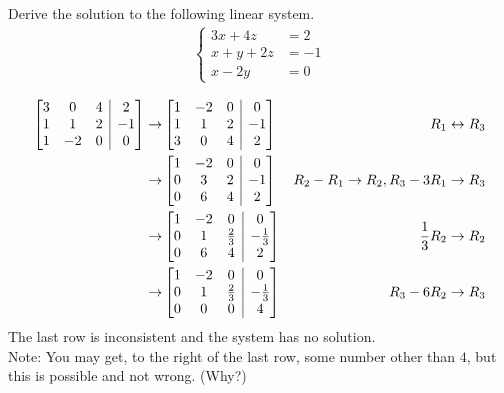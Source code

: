 \begin{Exercise}
Derive the solution to the following linear system.
\begin{align*}
\begin{cases}
3x + 4z &= 2\\
x + y + 2z &= -1\\
x - 2y &= 0
\end{cases}
\end{align*}
\end{Exercise}
\begin{Answer}
\begin{align*}
\left[
\begin{array}{@{}ccc|c@{}}
3 & 0 & 4 & 2\\
1 & 1 & 2 & -1\\
1 & -2 & 0 & 0
\end{array}
\right]
\to &
\left[
\begin{array}{@{}ccc|c@{}}
1 & -2 & 0 & 0\\
1 & 1 & 2 & -1\\
3 & 0 & 4 & 2\\
\end{array}
\right]
& R_1 \leftrightarrow R_3\\
\to &
\left[
\begin{array}{@{}ccc|c@{}}
1 & -2 & 0 & 0\\
0 & 3 & 2 & -1\\
0 & 6 & 4 & 2
\end{array}
\right]
& R_2 - R_1 \to R_2, R_3 - 3R_1 \to R_3 \\
\to &
\left[
\begin{array}{@{}ccc|c@{}}
1 & -2 & 0 & 0\\
0 & 1 & \frac{2}{3} & -\frac{1}{3}\\
0 & 6 & 4 & 2
\end{array}
\right] & \frac{1}{3}R_2 \to R_2 \\
\to &
\left[
\begin{array}{@{}ccc|c@{}}
1 & -2 & 0 & 0\\
0 & 1 & \frac{2}{3} & -\frac{1}{3}\\
0 & 0 & 0 & 4
\end{array}
\right] & R_3 - 6R_2 \to R_3
\end{align*}
The last row is inconsistent and the system has no solution.\\ 
Note: You may get, to the right of the last row, some number other than $4$, but this is possible and not wrong. (Why?)    
\end{Answer}

